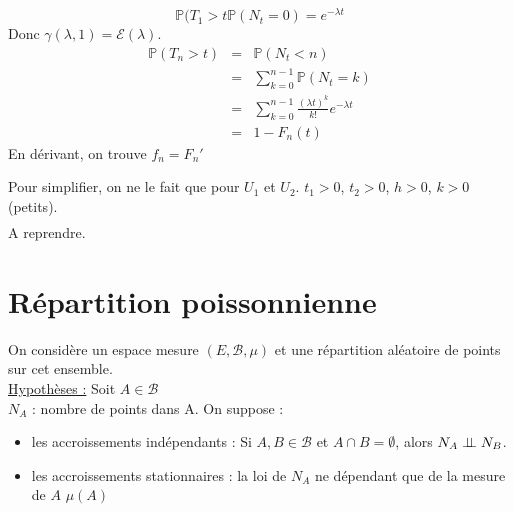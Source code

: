 
\begin{dem}
\[\mathbb{P}(T_1>t\mathbb{P}(N_t=0)=e^{-\lambda t}\]
Donc $\gamma(\lambda,1)=\mathcal{E}(\lambda)$.
\begin{eqnarray*}
	\mathbb{P}(T_n>t)&=&\mathbb{P}(N_t<n)\\
			&=&\sum_{k=0}^{n-1} \mathbb{P}(N_t=k)\\
			&=& \sum_{k=0}^{n-1} \frac{(\lambda t)^k}{k!} e^{-\lambda t}\\
			&=& 1-F_n(t)
\end{eqnarray*}
En dérivant, on trouve $f_n=F_n'$
\end{dem}


\begin{dem}
Pour simplifier, on ne le fait que pour $U_1$ et $U_2$.
$t_1>0$, $t_2>0$, $h>0$, $k>0$ (petits).\\
\begin{eqnarray*}
\end{eqnarray*}
A reprendre.
\end{dem}

\section{Répartition poissonnienne}
On considère un espace mesure $(E,\mathcal{B},\mu)$ et une répartition aléatoire de points sur cet ensemble.\\
\underline{Hypothèses :} Soit $A\in\mathcal{B}$\\
$N_A$ : nombre de points dans A. On suppose : \begin{itemize}
	\item les accroissements indépendants : Si $A,B\in\mathcal{B}$ et $A\cap B=\emptyset$, alors $N_A\perp \! \! \! \perp N_B$.
	\item les accroissements stationnaires : la loi de $N_A$ ne dépendant que de la mesure de $A$ $\mu(A)$
\end{itemize}


